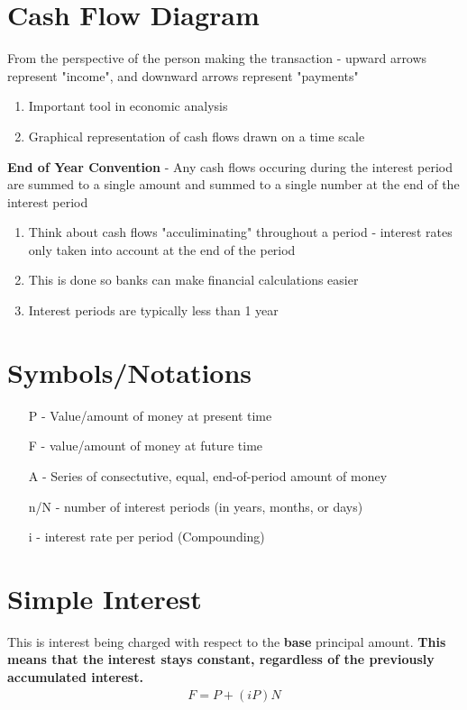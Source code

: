 \documentclass{report} %
\begin{document}
\section*{Cash Flow Diagram}
From the perspective of the person making the transaction - upward arrows represent "income", and downward arrows represent "payments"
\begin{enumerate}
    \item Important tool in economic analysis
    \item Graphical representation of cash flows drawn on a time scale
\end{enumerate}
\textbf{End of Year Convention} - Any cash flows occuring during the interest period are summed to a single amount and summed to a single number at the end of the interest period
\begin{enumerate}
    \item Think about cash flows "acculiminating" throughout a period - interest rates only taken into account at the end of the period
    \item This is done so banks can make financial calculations easier
    \item Interest periods are typically less than 1 year
\end{enumerate}

\section*{Symbols/Notations}
\begin{enumerate}
    \item [P] - Value/amount of money at present time 
    \item [F] - value/amount of money at future time
    \item [A] - Series of consectutive, equal, end-of-period amount of money
    \item [n/N] - number of interest periods (in years, months, or days)
    \item [i] - interest rate per period (Compounding)
\end{enumerate}

\section*{Simple Interest}
This is interest being charged with respect to the \textbf{base} principal amount. \textbf{This means that the interest stays constant, regardless of the previously accumulated interest.}
    \begin{equation*}
        \begin{aligned}
            F = P + (iP)N
        \end{aligned}
    \end{equation*}
\end{document}
